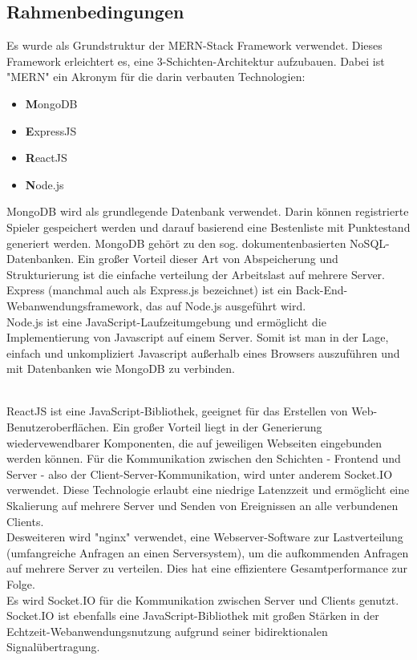 \documentclass[conference]{IEEEtran}
\begin{document}
\begin{itemize}


\subsection{Rahmenbedingungen}

Es wurde als Grundstruktur der MERN-Stack Framework verwendet.
Dieses Framework erleichtert es, eine 3-Schichten-Architektur aufzubauen. Dabei ist "MERN" ein Akronym für die darin verbauten Technologien:

\begin{itemize}
    \item \textbf {M}ongoDB
    \item \textbf {E}xpressJS
    \item \textbf {R}eactJS
    \item \textbf {N}ode.js
\end{itemize}

MongoDB wird als grundlegende Datenbank verwendet. Darin können registrierte Spieler gespeichert werden und darauf basierend eine Bestenliste mit Punktestand generiert werden.
MongoDB gehört zu den sog. dokumentenbasierten NoSQL-Datenbanken. Ein großer Vorteil dieser Art von Abspeicherung und Strukturierung ist die einfache verteilung der Arbeitslast auf mehrere Server.
\\
Express (manchmal auch als Express.js bezeichnet) ist ein Back-End-Webanwendungsframework, das auf Node.js ausgeführt wird.
\\
Node.js ist eine JavaScript-Laufzeitumgebung und ermöglicht die Implementierung von Javascript auf einem Server. Somit ist man in der Lage, einfach und unkompliziert Javascript außerhalb eines Browsers auszuführen und mit Datenbanken wie MongoDB zu verbinden.

\\
ReactJS ist eine JavaScript-Bibliothek, geeignet für das Erstellen von Web-Benutzeroberflächen. Ein großer Vorteil liegt in der Generierung wiedervewendbarer Komponenten, die auf jeweiligen Webseiten eingebunden werden können.
Für die Kommunikation zwischen den Schichten - Frontend und Server - also der Client-Server-Kommunikation, wird unter anderem Socket.IO verwendet. Diese Technologie erlaubt eine niedrige Latenzzeit und ermöglicht eine Skalierung auf mehrere Server und Senden von Ereignissen an alle verbundenen Clients.
\\
Desweiteren wird "nginx" verwendet, eine Webserver-Software zur Lastverteilung (umfangreiche Anfragen an einen Serversystem), um die aufkommenden Anfragen  auf mehrere Server zu verteilen. Dies hat eine effizientere Gesamtperformance zur Folge.
\\
Es wird Socket.IO für die Kommunikation zwischen Server und Clients genutzt. Socket.IO ist ebenfalls eine JavaScript-Bibliothek mit großen Stärken in der Echtzeit-Webanwendungsnutzung aufgrund seiner bidirektionalen Signalübertragung.


\end{itemize}
\end{document}
